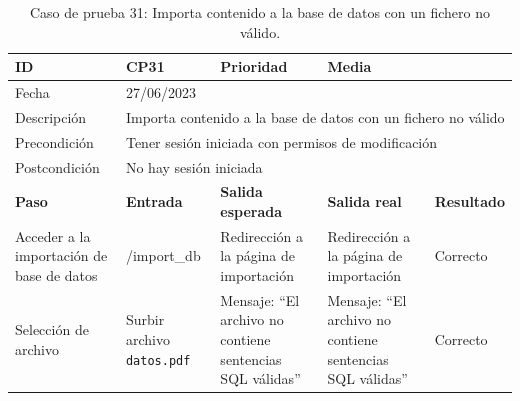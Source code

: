 \begin{table}[H]
\begin{tabular}{p{} p{} p{} p{} p{}}
\cellcolor{gray!25}
ID   & CP31 & \cellcolor{gray!25} Prioridad   & Media \\ \hline
\cellcolor{gray!25} Fecha	&	\multicolumn{4}{l}{27/06/2023} \\ \hline
\cellcolor{gray!25} Descripción		&	\multicolumn{4}{p{.66\textwidth}}{Importa contenido a la base de datos con un fichero no válido} \\ \hline                                            
\cellcolor{gray!25}
Precondición  & \multicolumn{4}{p{.66\textwidth}}{Tener sesión iniciada con permisos de modificación} \\ \hline
\cellcolor{gray!25} Postcondición & \multicolumn{4}{l}{No hay sesión iniciada}                                                    \\ \hline
\rowcolor{gray!25}
\textbf{Paso}   & \textbf{Entrada} & \textbf{Salida esperada} & \textbf{Salida real} & \textbf{Resultado} \\ \hline
Acceder a la importación de base de datos
& /import\_db                                                                          
& Redirección a la página de importación                              
& Redirección a la página de importación                               
& Correcto                            
\\ \hline
Selección de archivo
& Surbir archivo \texttt{datos.pdf}                                                                       
& Mensaje: ``El archivo no contiene sentencias SQL válidas''                             
& Mensaje: ``El archivo no contiene sentencias SQL válidas''                                
& Correcto                            
\\ \hline
\end{tabular}
\caption{Caso de prueba 31: Importa contenido a la base de datos con un fichero no válido.}
\end{table}


